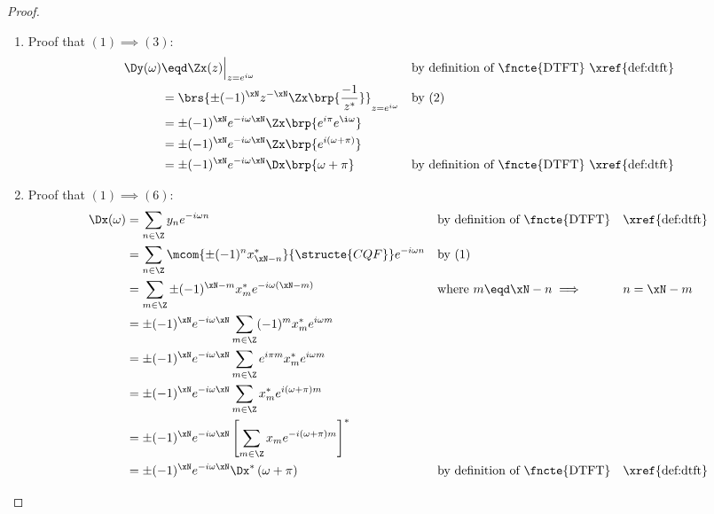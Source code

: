 \begin{proof}
\begin{enumerate}
  \item Proof that $(1)\implies(3)$:
    \begin{align*}
      \Dy(\omega)
        &\eqd \Zx(z)\Big|_{z=e^{i\omega}}
        &&    \text{by definition of \fncte{DTFT} \xref{def:dtft}}
      \\&=    \brs{\pm (-1)^\xN z^{-\xN}\Zx\brp{\frac{-1}{z^\ast}}}_{z=e^{i\omega}}
        &&    \text{by (2)}
      \\&=    \pm (-1)^\xN e^{-i\omega\xN}\Zx\brp{e^{i\pi}e^{\i\omega}}
      \\&=    \pm (-1)^\xN e^{-i\omega\xN}\Zx\brp{e^{i(\omega+\pi)}}
      \\&=    \pm (-1)^\xN e^{-i\omega\xN}\Dx\brp{\omega+\pi}
        &&    \text{by definition of \fncte{DTFT} \xref{def:dtft}}
    \end{align*}

  \item Proof that $(1)\implies(6)$:
    \begin{align*}
      \Dx(\omega)
        &= \sum_{n\in\Z}  y_{n}  e^{-i\omega n}
        && \text{by definition of \fncte{DTFT}}
        && \text{\xref{def:dtft}}
      \\&= \sum_{n\in\Z} \mcom{\pm (-1)^n x_{\xN-n}^\ast}{\structe{CQF}} e^{-i\omega n}
        && \text{by (1)}
      \\&= \sum_{m\in\Z}\pm (-1)^{\xN-m} x_m^\ast e^{-i\omega (\xN-m)}
        && \text{where $m\eqd\xN-n \implies$}
        && \text{$n=\xN-m$}
      \\&= \pm (-1)^\xN e^{-i\omega\xN}
           \sum_{m\in\Z}(-1)^m x_m^\ast e^{i\omega m}
      \\&= \pm (-1)^\xN e^{-i\omega\xN}
           \sum_{m\in\Z}e^{i\pi m} x_m^\ast e^{i\omega m}
      \\&= \pm (-1)^\xN e^{-i\omega\xN}
           \sum_{m\in\Z}x_m^\ast e^{i (\omega+\pi )m}
      \\&= \pm (-1)^\xN e^{-i\omega\xN}
           \left[ \sum_{m\in\Z}x_m e^{-i(\omega+\pi )m} \right]^\ast
      \\&= \pm (-1)^\xN e^{-i\omega\xN}\Dx^\ast\left(\omega+\pi \right)
        && \text{by definition of \fncte{DTFT}}
        && \text{\xref{def:dtft}}
    \end{align*}


\end{enumerate}
\end{proof}
